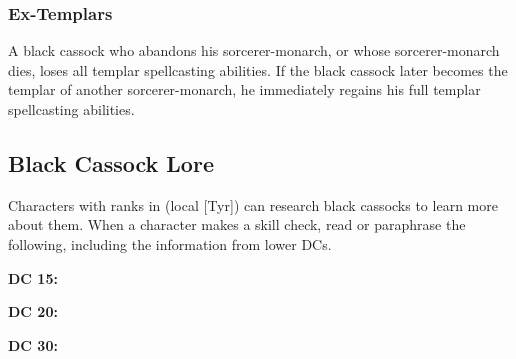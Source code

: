 \subsubsection{Ex-Templars}
A black cassock who abandons his sorcerer-monarch, or whose sorcerer-monarch dies, loses all templar spellcasting abilities. If the black cassock later becomes the templar of another sorcerer-monarch, he immediately regains his full templar spellcasting abilities.

\subsection{Black Cassock Lore}
Characters with ranks in  (local [Tyr]) can research black cassocks to learn more about them. When a character makes a skill check, read or paraphrase the following, including the information from lower DCs.

\textbf{DC 15:}

\textbf{DC 20:}

\textbf{DC 30:}